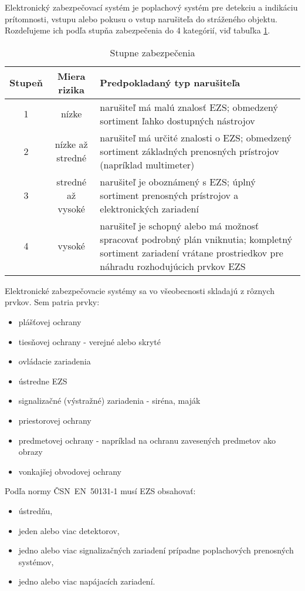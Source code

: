 Elektronický zabezpečovací systém je poplachový systém pre detekciu a indikáciu prítomnosti, vstupu alebo pokusu o vstup narušiteľa do stráženého objektu. Rozdeľujeme ich podľa stupňa zabezpečenia do 4 kategórií, viď tabuľka \ref{tab:stupenzabezpecenia}.
\begin{table}[ht]
    \centering
    \renewcommand{\arraystretch}{1.5}
    \begin{tabular}{|c|c|p{8cm}|}
        \hline
        \textbf{Stupeň} & \textbf{Miera rizika} & \textbf{Predpokladaný typ narušiteľa}\\ \hline
        1& nízke & narušiteľ má malú znalosť EZS; obmedzený sortiment ľahko dostupných nástrojov\\ \hline
        2 & nízke až stredné &narušiteľ má určité znalosti o EZS; obmedzený sortiment základných prenosných prístrojov (napríklad multimeter)\\ \hline
        3 & stredné až vysoké & narušiteľ je oboznámený s EZS; úplný sortiment prenosných prístrojov a elektronických zariadení \\ \hline
        4 & vysoké & narušiteľ je schopný alebo má možnosť spracovať podrobný plán vniknutia; kompletný sortiment zariadení vrátane prostriedkov pre náhradu rozhodujúcich prvkov EZS\\ \hline
    \end{tabular}
    \caption{Stupne zabezpečenia\cite{csn-en-50131-1}\cite{Krecek}}
    \label{tab:stupenzabezpecenia}
\end{table}

Elektronické zabezpečovacie systémy sa vo všeobecnosti skladajú z rôznych prvkov. Sem patria prvky:\cite{velas_ezs}
\begin{itemize}
    \item plášťovej ochrany
    \item tiesňovej ochrany - verejné alebo skryté
    \item ovládacie zariadenia
    \item ústredne EZS
    \item signalizačné (výstražné) zariadenia - siréna, maják
    \item priestorovej ochrany
    \item predmetovej ochrany - napríklad na ochranu zavesených predmetov ako obrazy
    \item vonkajšej obvodovej ochrany
\end{itemize}
Podľa normy ČSN~EN~50131-1 musí EZS obsahovať:
\begin{itemize}
    \item ústredňu, 
    \item jeden alebo viac detektorov,
    \item jedno alebo viac signalizačných zariadení prípadne poplachových prenosných systémov,
    \item jedno alebo viac napájacích zariadení. 
\end{itemize}

